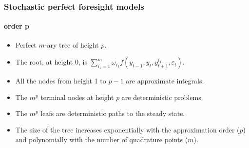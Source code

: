\documentclass{beamer}
\begin{document}
\begin{frame}%
   \frametitle{Stochastic perfect foresight models}
   \framesubtitle{order p}

   \begin{itemize}

      \item Perfect $m$-ary tree of height $p$.\newline

      \item The root, at height 0, is $\sum_{i_1=1}^m \omega_{i_1}f\left(y_{t-1}, y_t, y_{t+1}^{i_1}, \varepsilon_t \right)$.\newline

      \item All the nodes from height 1 to $p-1$ are approximate integrals.\newline

      \item The $m^p$ terminal nodes at height $p$ are deterministic problems.\newline

      \item The $m^p$ leafs are deterministic paths to the steady state.\newline

      \item The size of the tree increases exponentially with the approximation order ($p$) and polynomially with the number of quadrature points ($m$).

   \end{itemize}

\end{frame}
\end{document}
